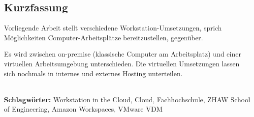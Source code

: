 
\subsection*{Kurzfassung}
Vorliegende Arbeit stellt verschiedene Workstation-Umsetzungen, sprich Möglichkeiten Computer-Arbeitsplätze bereitzustellen, gegenüber.

Es wird zwischen on-premise (klassische Computer am Arbeitsplatz) und einer virtuellen Arbeitsumgebung unterschieden.
Die virtuellen Umsetzungen lassen sich nochmals in internes und externes Hosting unterteilen.



%
\mbox{}\\[0.5\baselineskip]\noindent
\textbf{Schlagwörter:} 
Workstation in the Cloud, Cloud, Fachhochschule, ZHAW School of Engineering, Amazon Workspaces, VMware VDM
